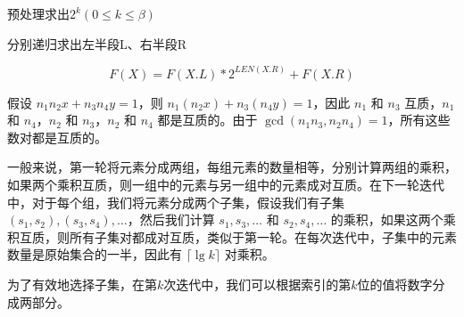 \documentclass[a4paper, justified]{tufte-handout}
\begin{document}
\begin{solution}
	预处理求出$2^k(0\leq k \leq \beta)$

	分别递归求出左半段L、右半段R

	$$F(X)=F(X.L)*2^{LEN(X.R)}+F(X.R)$$
\end{solution}

\begin{problem}[TC 31.2-9]
\end{problem}

\begin{solution}
	假设 $n_1n_2 x + n_3n_4 y = 1$，则 $n_1(n_2 x) + n_3(n_4 y) = 1$，因此 $n_1$ 和 $n_3$ 互质，$n_1$ 和 $n_4$，$n_2$ 和 $n_3$，$n_2$ 和 $n_4$ 都是互质的。由于 $\gcd(n_1n_3, n_2n_4) = 1$，所有这些数对都是互质的。

	一般来说，第一轮将元素分成两组，每组元素的数量相等，分别计算两组的乘积，如果两个乘积互质，则一组中的元素与另一组中的元素成对互质。在下一轮迭代中，对于每个组，我们将元素分成两个子集，假设我们有子集 ${ (s_1, s_2), (s_3, s_4), \ldots }$，然后我们计算 ${ s_1, s_3, \ldots }$ 和 ${ s_2, s_4, \ldots }$ 的乘积，如果这两个乘积互质，则所有子集对都成对互质，类似于第一轮。在每次迭代中，子集中的元素数量是原始集合的一半，因此有 $\lceil \lg k \rceil$ 对乘积。

	为了有效地选择子集，在第$k$次迭代中，我们可以根据索引的第$k$位的值将数字分成两部分。
\end{solution}
\end{document}
